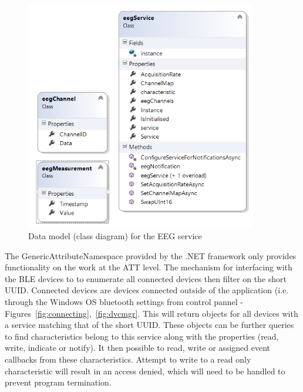 \documentclass[]{article}
\begin{document}
\begin{figure}[htb]
	\begin{center}
		\includegraphics[width = 0.9\textwidth]{classdiagram}
	\end{center}
	\caption{Data model (class diagram) for the \ac{EEG} service}
	\label{fig:classdiagram}
\end{figure}

The GenericAttributeNamespace provided by the .NET framework only provides functionality on the work at the \ac{ATT} level. The mechanism for interfacing with the \ac{BLE} devices to to enumerate all connected devices then filter on the short \ac{UUID}. Connected devices are devices connected outside of the application (i.e. through the Windows OS bluetooth settings from control pannel - Figures~\ref{fig:connecting},~\ref{fig:dvcmgr}. This will return objects for all devices with a service matching that of the short \ac{UUID}. These objects can be further queries to find characteristics belong to this service along with the properties (read, write, indicate or notify). It then possible to read, write or assigned event callbacks from these characteristics. Attempt to write to a read only characteristic will result in an access denied, which will need to be handled to prevent program termination.  
\end{document}
